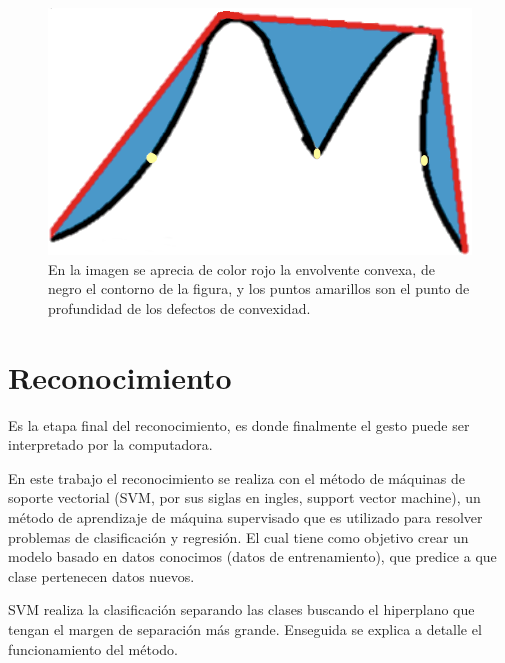 \begin{figure}[h!]
\begin{center}
\includegraphics[scale=.45]{./Figures/ConvexHullAndDefects.png}
\end{center}
\caption{En la imagen se aprecia de color rojo la envolvente convexa, de negro el contorno de la figura, y los puntos amarillos son el punto de profundidad de los defectos de convexidad.}
\label{fig:FigConvexHullDefects}
\end{figure} 



\section{Reconocimiento}\label{sec:SVM} 

Es la etapa final del reconocimiento, es donde finalmente el gesto puede ser interpretado por la computadora.  

En este trabajo el reconocimiento se realiza con el método de máquinas de soporte vectorial (SVM, por sus siglas en ingles, support vector machine), un método de aprendizaje de máquina supervisado que es utilizado para resolver problemas de clasificación y regresión. El cual tiene como objetivo crear un modelo basado en datos conocimos (datos de entrenamiento), que predice a que clase pertenecen datos nuevos. 

SVM realiza la clasificación separando las clases buscando el hiperplano que tengan el margen  de separación más grande. Enseguida se explica a detalle el funcionamiento del método. 

